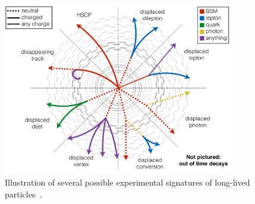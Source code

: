\begin{figure}
\centering
\includegraphics[width=0.9\textwidth]{figures/overview/llp_signatures.pdf}
\caption{Illustration of several possible experimental signatures of long-lived particles~\cite{jamie}.} 
\label{llp_signatures}
\end{figure}